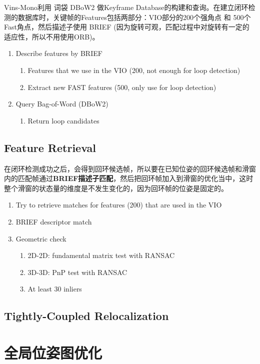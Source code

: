 \documentclass[12pt,a4paper]{article}
\begin{document}
Vins-Mono利用 词袋 DBoW2 做Keyframe Database的构建和查询。在建立闭环检测的数据库时，关键帧的Features包括两部分：VIO部分的200个强角点 和 500个Fast角点，然后描述子使用 BRIEF (因为旋转可观，匹配过程中对旋转有一定的适应性，所以不用使用ORB)。

\begin{enumerate}
\item Describe features by BRIEF
  \begin{enumerate}
  \item Features that we use in the VIO (200, not enough for loop detection)
  \item Extract new FAST features (500, only use for loop detection)
  \end{enumerate}
\item Query Bag-of-Word (DBoW2)
  \begin{enumerate}
  \item Return loop candidates
  \end{enumerate}
\end{enumerate}

\subsection{Feature Retrieval}

在闭环检测成功之后，会得到回环候选帧，所以要在已知位姿的回环候选帧和滑窗内的匹配帧通过\textbf{BRIEF描述子匹配}，然后把回环帧加入到滑窗的优化当中，这时整个滑窗的状态量的维度是不发生变化的，因为回环帧的位姿是固定的。

\begin{enumerate}
\item Try to retrieve matches for features (200) that are used in the VIO
\item BRIEF descriptor match
\item Geometric check
  \begin{enumerate}
  \item 2D-2D: fundamental matrix test with RANSAC
  \item 3D-3D: PnP test with RANSAC
  \item At least 30 inliers
  \end{enumerate}
\end{enumerate}

\subsection{Tightly-Coupled Relocalization}

\section{全局位姿图优化}
\end{document}
